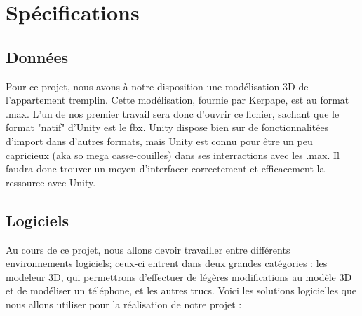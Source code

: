 \section{Spécifications}

\subsection{Données}
	Pour ce projet, nous avons à notre disposition une modélisation 3D de l'appartement tremplin. Cette modélisation, fournie par Kerpape, est au format .max.
	L'un de nos premier travail sera donc d'ouvrir ce fichier, sachant que le format "natif" d'Unity est le fbx. Unity dispose bien sur de fonctionnalitées d'import dans d'autres formats, mais Unity est connu pour être un peu capricieux (aka so mega casse-couilles) dans ses interractions avec les .max.
	Il faudra donc trouver un moyen d'interfacer correctement et efficacement la ressource avec Unity.
	
\subsection{Logiciels}
	Au cours de ce projet, nous allons devoir travailler entre différents environnements logiciels; ceux-ci entrent dans deux grandes catégories : les modeleur 3D, qui permettrons d'effectuer de légères modifications au modèle 3D et de modéliser un téléphone, et les autres trucs.
	Voici les solutions logicielles que nous allons utiliser pour la réalisation de notre projet :
	
